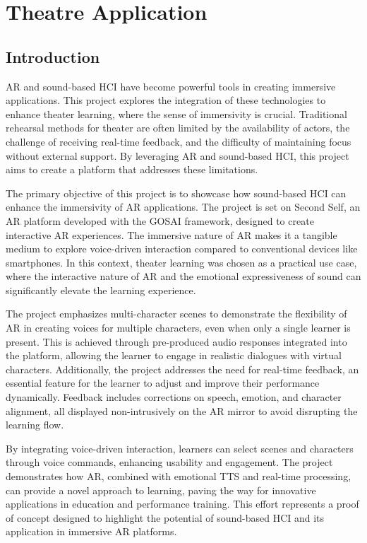 \section{Theatre Application}

\subsection{Introduction}

AR and sound-based HCI have become powerful tools in creating immersive applications. This project explores the integration of these technologies to enhance theater learning, where the sense of immersivity is crucial. Traditional rehearsal methods for theater are often limited by the availability of actors, the challenge of receiving real-time feedback, and the difficulty of maintaining focus without external support. By leveraging AR and sound-based HCI, this project aims to create a platform that addresses these limitations.

The primary objective of this project is to showcase how sound-based HCI can enhance the immersivity of AR applications. The project is set on Second Self, an AR platform developed with the GOSAI framework, designed to create interactive AR experiences. The immersive nature of AR makes it a tangible medium to explore voice-driven interaction compared to conventional devices like smartphones. In this context, theater learning was chosen as a practical use case, where the interactive nature of AR and the emotional expressiveness of sound can significantly elevate the learning experience.

The project emphasizes multi-character scenes to demonstrate the flexibility of AR in creating voices for multiple characters, even when only a single learner is present. This is achieved through pre-produced audio responses integrated into the platform, allowing the learner to engage in realistic dialogues with virtual characters. Additionally, the project addresses the need for real-time feedback, an essential feature for the learner to adjust and improve their performance dynamically. Feedback includes corrections on speech, emotion, and character alignment, all displayed non-intrusively on the AR mirror to avoid disrupting the learning flow.

By integrating voice-driven interaction, learners can select scenes and characters through voice commands, enhancing usability and engagement. The project demonstrates how AR, combined with emotional TTS and real-time processing, can provide a novel approach to learning, paving the way for innovative applications in education and performance training. This effort represents a proof of concept designed to highlight the potential of sound-based HCI and its application in immersive AR platforms.

